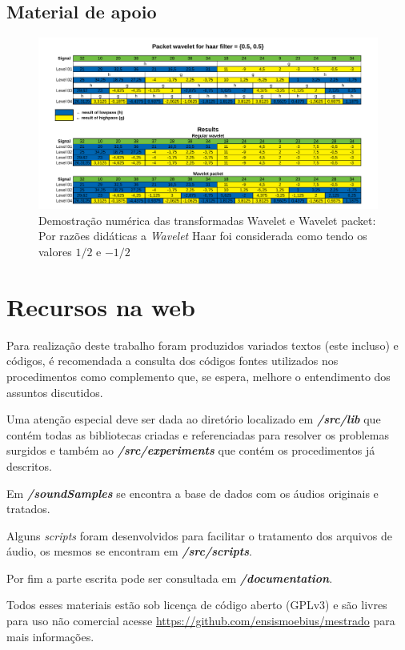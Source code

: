\begin{apendicesenv}
	\partapendices
	\begin{landscape}
		\chapter{Material de apoio}
		\begin{figure}[h]
			\includegraphics[width=.9\linewidth]{images/haarWaveletExamples.pdf}
			\caption{Demostração numérica das transformadas Wavelet e Wavelet packet: Por razões didáticas a \textit{Wavelet} Haar foi considerada como tendo os valores $1/2$ e $-1/2$}
			\label{fig:haarWaveletExamples}
		\end{figure}
	\end{landscape}
	\chapter{Recursos na web}
		\par Para realização deste trabalho foram produzidos variados textos (este incluso) e códigos, é recomendada a consulta dos códigos fontes utilizados nos procedimentos como complemento que, se espera, melhore o entendimento dos assuntos discutidos.
		
		\par Uma atenção especial deve ser dada ao diretório localizado em \textit{\textbf{/src/lib}} que contém todas as bibliotecas criadas e referenciadas para resolver os problemas surgidos e também ao \textit{\textbf{/src/experiments}} que contém os procedimentos já descritos.
				
		\par Em \textit{\textbf{/soundSamples}} se encontra a base de dados com os áudios originais e tratados.
		
		\par Alguns \textit{scripts} foram desenvolvidos para facilitar o tratamento dos arquivos de áudio, os mesmos se encontram em \textbf{\textit{/src/scripts}}.
		
		\par Por fim a parte escrita pode ser consultada em \textit{\textbf{/documentation}}.
		
		\par Todos esses materiais estão sob licença de código aberto (GPLv3) e são livres para uso não comercial acesse   \href{https://github.com/ensismoebius/mestrado}{https://github.com/ensismoebius/mestrado} para mais informações.
\end{apendicesenv}